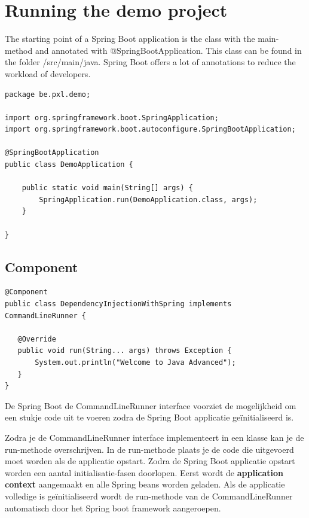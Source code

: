 \section{Running the demo project}

The starting point of a Spring Boot application is the class with the main-method and annotated with @SpringBootApplication.  This class can be found in the folder /src/main/java.  Spring Boot offers a lot of annotations to reduce the workload of developers.   

\begin{lstlisting}[frame=single]
package be.pxl.demo;

import org.springframework.boot.SpringApplication;
import org.springframework.boot.autoconfigure.SpringBootApplication;

@SpringBootApplication
public class DemoApplication {

    public static void main(String[] args) {
        SpringApplication.run(DemoApplication.class, args);
    }

}
\end{lstlisting}

\subsection{Component}


\begin{lstlisting}
@Component
public class DependencyInjectionWithSpring implements CommandLineRunner {
   
   @Override    
   public void run(String... args) throws Exception {
	   System.out.println("Welcome to Java Advanced");
   }
}
\end{lstlisting}

De Spring Boot de CommandLineRunner interface voorziet de mogelijkheid om een stukje code uit te voeren zodra de Spring Boot applicatie ge\"initialiseerd is. 

Zodra je de CommandLineRunner interface implementeert in een klasse kan je de run-methode overschrijven. In de run-methode plaats je de code die uitgevoerd moet worden
als de applicatie opstart.  Zodra de Spring Boot applicatie opstart worden een aantal initialisatie-fasen doorlopen.  Eerst wordt de \textbf{application context} aangemaakt en alle Spring beans worden geladen. Als de applicatie volledige is ge\"initialiseerd wordt de run-methode van de CommandLineRunner automatisch door het Spring boot framework aangeroepen.



